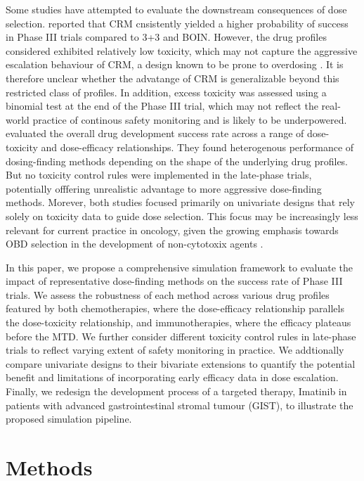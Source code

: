 \documentclass[11pt]{article}
\begin{document}
Some studies have attempted to evaluate the downstream consequences of dose selection. \textcite{conaway2019impact} reported that CRM cnsistently yielded a higher probability of success in Phase III trials compared to 3+3 and BOIN. However, the drug profiles considered exhibited relatively low toxicity, which may not capture the aggressive escalation behaviour of CRM, a design known to be prone to overdosing \parencite{EWOC}. It is therefore unclear whether the advatange of CRM is generalizable beyond this restricted class of profiles. In addition, excess toxicity was assessed using a binomial test at the end of the Phase III trial, which may not reflect the real-world practice of continous safety monitoring and is likely to be underpowered. \textcite{ruppert2018overall} evaluated the overall drug development success rate across a range of dose-toxicity and dose-efficacy relationships. They found heterogenous performance of dosing-finding methods depending on the shape of the underlying drug profiles. But no toxicity control rules were implemented in the late-phase trials, potentially offfering unrealistic advantage to more aggressive dose-finding methods. Morever, both studies focused primarily on univariate designs that rely solely on toxicity data to guide dose selection. This focus may be increasingly less relevant for current practice in oncology, given the growing emphasis towards OBD selection in the development of non-cytotoxix agents \parencite{araujo2023oncology}. 

In this paper, we propose a comprehensive simulation framework to evaluate the impact of representative dose-finding methods on the success rate of Phase III trials. We assess the robustness of each method across various drug profiles featured by both chemotherapies, where the dose-efficacy relationship parallels the dose-toxicity relationship, and immunotherapies, where the efficacy plateaus before the MTD. We further consider different toxicity control rules in late-phase trials to reflect varying extent of safety monitoring in practice. We addtionally compare univariate designs to their bivariate extensions to quantify the potential benefit and limitations of incorporating early efficacy data in dose escalation. Finally, we redesign the development process of a targeted therapy, Imatinib in patients with advanced gastrointestinal stromal tumour (GIST), to illustrate the proposed simulation pipeline.
\section{Methods}
\end{document}
